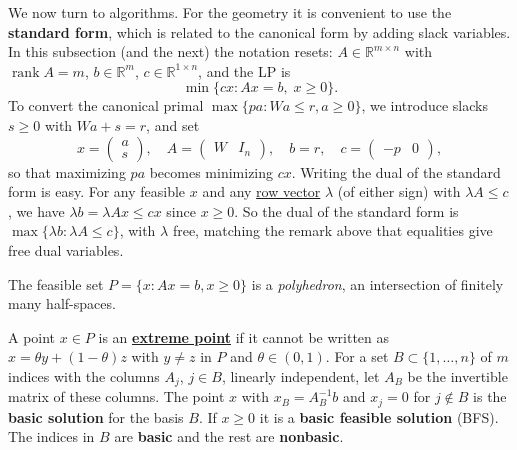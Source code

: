 	We now turn to algorithms. For the geometry it is convenient to use the \textbf{standard form}, which is related to the canonical form by adding slack variables. In this subsection (and the next) the notation resets: $A \in \mathbb{R}^{m \times n}$ with $\operatorname{rank} A = m$, $b \in \mathbb{R}^m$, $c \in \mathbb{R}^{1 \times n}$, and the LP is 
	\begin{equation}
		\min \{cx \colon Ax = b,\; x \geq 0\}.
	\end{equation}
	To convert the canonical primal $\max\{pa \colon Wa \leq r, a \geq 0\}$, we introduce slacks $s \geq 0$ with $Wa + s = r$, and set 
	\begin{equation}
		x = \begin{pmatrix} a \\ s \end{pmatrix}, \quad A = \begin{pmatrix} W & I_n \end{pmatrix}, \quad b = r, \quad c = \begin{pmatrix} -p & 0 \end{pmatrix},
	\end{equation}
	so that maximizing $pa$ becomes minimizing $cx$. 	Writing the dual of the standard form is easy. For any feasible $x$ and any \hyperref[lin-def:row-vector]{row vector} $\lambda$ (of either sign) with $\lambda A \leq c$, we have $\lambda b = \lambda A x \leq cx$ since $x \geq 0$. So the dual of the standard form is $\max\{\lambda b \colon \lambda A \leq c\}$, with $\lambda$ free, matching the remark above that equalities give free dual variables. 

	The feasible set $P = \{x \colon Ax = b, x \geq 0\}$ is a \textit{polyhedron}, an intersection of finitely many half-spaces. 

	\begin{definition}
	  \label{def:extreme-point-basic-feasible-solution}
		A point $x \in P$ is an \textbf{\hyperref[alg-def:extreme-point]{extreme point}} if it cannot be written as $x = \theta y + (1 - \theta) z$ with $y \neq z$ in $P$ and $\theta \in (0, 1)$. For a set $B \subset \{1, \ldots, n\}$ of $m$ indices with the columns $A_j$, $j \in B$, linearly independent, let $A_B$ be the invertible matrix of these columns. The point $x$ with $x_B = A_B^{-1} b$ and $x_j = 0$ for $j \notin B$ is the \textbf{basic solution} for the basis $B$. If $x \geq 0$ it is a \textbf{basic feasible solution} (BFS). The indices in $B$ are \textbf{basic} and the rest are \textbf{nonbasic}. 
	\end{definition}

